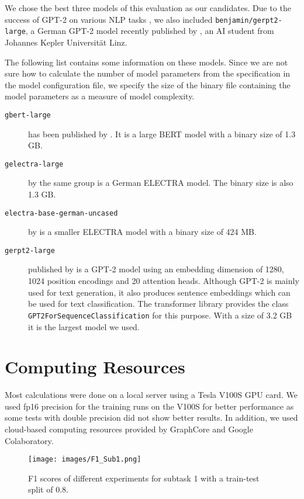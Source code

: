 \documentclass[11pt,a4paper]{article}
\begin{document}
We chose the best three models of this evaluation as our candidates.
Due to the success of GPT-2 on various NLP tasks \cite{GPT2}, we also included  
\texttt{benjamin/gerpt2-large}, a German GPT-2 model recently published by \citet{benjamin/gerpt2-large}, 
an AI student from Johannes Kepler Universit\"at Linz.

The following list contains some information on these models. Since we are not sure how to calculate the number of model parameters from the specification in the model 
configuration file, we specify the size of the binary file containing the model parameters as a measure of model complexity.

\begin{description}
  \item[\texttt{gbert-large}] has been published by \citet{GNLM}. It is a large BERT model with a binary size of 1.3 GB.
  \item[\texttt{gelectra-large}] by the same group is a German ELECTRA model. The binary size is also 1.3 GB.
  \item[\texttt{electra-base-german-uncased}] by \citet{german-nlp-group/electra-base-german-uncased} is a smaller ELECTRA model with a binary size of 424 MB.
  \item[\texttt{gerpt2-large}] published by \citet{benjamin/gerpt2-large} is a GPT-2 model using an embedding dimension of 1280, 1024 position encodings and 20 attention heads. Although 
  GPT-2 is mainly used for text generation, it also produces sentence embeddings which can be used for text classification. The transformer library 
  provides the class \texttt{GPT2ForSequenceClassification} for this purpose. With a size of 3.2 GB it is the largest model we used.
\end{description}

\section{Computing Resources}
Most calculations were done on a local server using a Tesla V100S GPU card. We used fp16 precision for the training runs on the V100S for better 
performance as some tests with double precision did not show better results.
In addition, we used cloud-based computing resources provided by GraphCore and Google Colaboratory.


\begin{figure}[h]
  \texttt{[image: images/F1\_Sub1.png]}
  \caption{\label{plot:F1_Sub1}F1 scores of different experiments for subtask 1 with a train-test split of 0.8.}
\end{figure}
\end{document}
